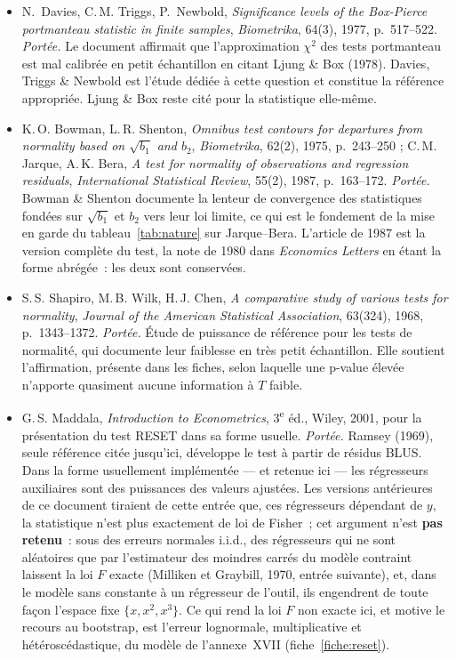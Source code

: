 \documentclass[a4paper,11pt]{article}
\begin{document}
\begin{itemize}[itemsep=4pt]
  \item N.~Davies, C.\,M. Triggs, P.~Newbold, \emph{Significance levels of the
  Box-Pierce portmanteau statistic in finite samples}, \emph{Biometrika}, 64(3),
  1977, p.~517--522.
  \emph{Portée.} Le document affirmait que l'approximation
  $\chi^2$ des tests portmanteau est mal calibrée en petit échantillon en
  citant Ljung \& Box (1978). Davies, Triggs \& Newbold est l'étude dédiée à
  cette question et constitue la référence appropriée. Ljung \& Box reste cité
  pour la statistique elle-même.

  \item K.\,O. Bowman, L.\,R. Shenton, \emph{Omnibus test contours for
  departures from normality based on $\sqrt{b_1}$ and $b_2$},
  \emph{Biometrika}, 62(2), 1975, p.~243--250 ; C.\,M. Jarque, A.\,K. Bera,
  \emph{A test for normality of observations and regression residuals},
  \emph{International Statistical Review}, 55(2), 1987, p.~163--172.
  \emph{Portée.} Bowman \& Shenton documente la lenteur de
  convergence des statistiques fondées sur $\sqrt{b_1}$ et $b_2$ vers leur loi
  limite, ce qui est le fondement de la mise en garde du
  tableau~\ref{tab:nature} sur Jarque--Bera. L'article de 1987 est la version
  complète du test, la note de 1980 dans \emph{Economics Letters} en étant la
  forme abrégée~: les deux sont conservées.

  \item S.\,S. Shapiro, M.\,B. Wilk, H.\,J. Chen, \emph{A comparative study of
  various tests for normality}, \emph{Journal of the American Statistical
  Association}, 63(324), 1968, p.~1343--1372.
  \emph{Portée.} Étude de puissance de référence pour les tests de
  normalité, qui documente leur faiblesse en très petit échantillon. Elle
  soutient l'affirmation, présente dans les fiches, selon laquelle une p-value
  élevée n'apporte quasiment aucune information à $T$ faible.

  \item G.\,S. Maddala, \emph{Introduction to Econometrics}, 3\textsuperscript{e}
  éd., Wiley, 2001, pour la présentation du test RESET dans sa forme usuelle.
  \emph{Portée.} Ramsey (1969), seule référence citée jusqu'ici,
  développe le test à partir de résidus BLUS. Dans la forme usuellement
  implémentée --- et retenue ici --- les régresseurs auxiliaires sont des
  puissances des valeurs ajustées. Les versions antérieures de ce document
  tiraient de cette entrée que, ces régresseurs dépendant de $y$, la statistique
  n'est plus exactement de loi de Fisher~; cet argument n'est \textbf{pas
  retenu}~: sous des erreurs normales i.i.d., des régresseurs qui ne sont
  aléatoires que par l'estimateur des moindres carrés du modèle contraint
  laissent la loi $F$ exacte (Milliken et Graybill, 1970, entrée suivante), et,
  dans le modèle sans constante à un régresseur de l'outil, ils engendrent de
  toute façon l'espace fixe $\{x, x^2, x^3\}$. Ce qui rend la loi $F$ non exacte
  ici, et motive le recours au bootstrap, est l'erreur lognormale,
  multiplicative et hétéroscédastique, du modèle de l'annexe~XVII
  (fiche~\ref{fiche:reset}).


\end{itemize}
\end{document}
